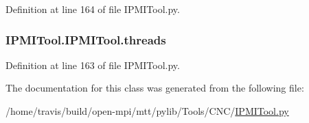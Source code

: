 Definition at line 164 of file I\-P\-M\-I\-Tool.\-py.

\hypertarget{classIPMITool_1_1IPMITool_a2f6ca8b0b509ba2c514b72312841b2d6}{
\subsubsection[{threads}]{\setlength{\rightskip}{0pt plus 5cm}I\-P\-M\-I\-Tool.\-I\-P\-M\-I\-Tool.\-threads}}\label{classIPMITool_1_1IPMITool_a2f6ca8b0b509ba2c514b72312841b2d6}


Definition at line 163 of file I\-P\-M\-I\-Tool.\-py.



The documentation for this class was generated from the following file\-:\begin{DoxyCompactItemize}
\item 
/home/travis/build/open-\/mpi/mtt/pylib/\-Tools/\-C\-N\-C/\hyperlink{IPMITool_8py}{I\-P\-M\-I\-Tool.\-py}\end{DoxyCompactItemize}
